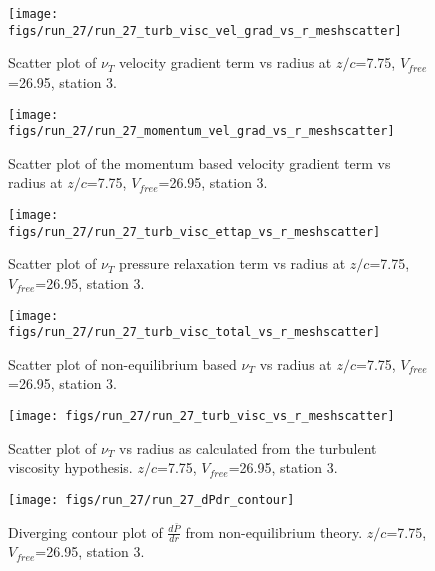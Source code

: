 \begin{figure}[H]
\centering
\texttt{[image: figs/run\_27/run\_27\_turb\_visc\_vel\_grad\_vs\_r\_meshscatter]}
\caption{Scatter plot of $\nu_T$ velocity gradient term vs radius at $z/c$=7.75, $V_{free}$=26.95, station 3.}
\end{figure}


\begin{figure}[H]
\centering
\texttt{[image: figs/run\_27/run\_27\_momentum\_vel\_grad\_vs\_r\_meshscatter]}
\caption{Scatter plot of the momentum based velocity gradient term vs radius at $z/c$=7.75, $V_{free}$=26.95, station 3.}
\end{figure}


\begin{figure}[H]
\centering
\texttt{[image: figs/run\_27/run\_27\_turb\_visc\_ettap\_vs\_r\_meshscatter]}
\caption{Scatter plot of $\nu_T$ pressure relaxation term vs radius at $z/c$=7.75, $V_{free}$=26.95, station 3.}
\end{figure}


\begin{figure}[H]
\centering
\texttt{[image: figs/run\_27/run\_27\_turb\_visc\_total\_vs\_r\_meshscatter]}
\caption{Scatter plot of non-equilibrium based $\nu_T$ vs radius at $z/c$=7.75, $V_{free}$=26.95, station 3.}
\end{figure}


\begin{figure}[H]
\centering
\texttt{[image: figs/run\_27/run\_27\_turb\_visc\_vs\_r\_meshscatter]}
\caption{Scatter plot of $\nu_T$ vs radius as calculated from the turbulent viscosity hypothesis. $z/c$=7.75, $V_{free}$=26.95, station 3.}
\end{figure}


\begin{figure}[H]
\centering
\texttt{[image: figs/run\_27/run\_27\_dPdr\_contour]}
\caption{Diverging contour plot of $\frac{d\bar{P}}{dr}$ from non-equilibrium theory. $z/c$=7.75, $V_{free}$=26.95, station 3.}
\end{figure}


